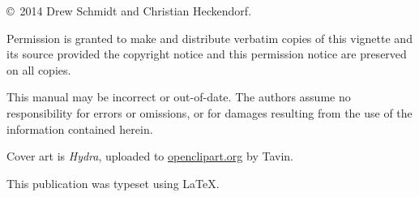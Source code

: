 \null
\vfill
\copyright\ 2014 Drew Schmidt and Christian Heckendorf.

Permission is granted to make and distribute verbatim copies of
this vignette and its source provided the copyright notice and
this permission notice are preserved on all copies.

This manual may be incorrect or out-of-date.  The authors assume
no responsibility for errors or omissions, or for damages resulting
from the use of the information contained herein.

Cover art is \textit{Hydra}, uploaded to \url{openclipart.org} by Tavin.

This publication was typeset using \LaTeX.
